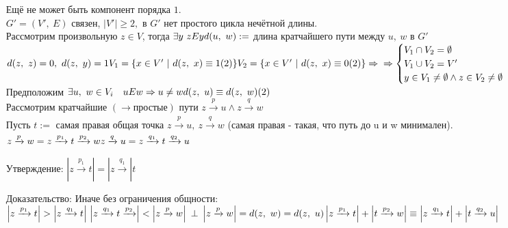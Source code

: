 \documentclass[12pt, letterpaper, twoside]{article}
\newcommand{\Abs}[1]{\left| #1 \right|}
\begin{document}
\begin{enumerate}
        Ещё не может быть компонент порядка $1$.\\
        $G' = (V',\ E)$ связен, $|V'| \geq 2,$ в $G'$ нет простого цикла нечётной длины.\\
        Рассмотрим произвольную $z\in V$, тогда $\exists y\ zEy\\
        d(u,\ w) := $ длина кратчайшего пути между $u,\ w$ в $G'$\\
        $d(z,\ z) = 0,\ d(z,\ y) = 1\\
        V_1 = \{x\in V'\ |\ d(z,\ x) \equiv 1 (2)\}\\
        V_2 = \{x \in V'\ |\ d(z,\ x) \equiv 0 (2)\}\Rightarrow\\
        \Rightarrow \begin{cases}
            V_1 \cap V_2 = \emptyset\\
            V_1 \cup V_2 = V'\\
            y\in V_1\neq \emptyset\wedge z \in V_2 \neq \emptyset
        \end{cases}$\\
        Предположим $\exists u,\ w\in V_i\quad uEw\Rightarrow u\neq w\\
        d(z,\ u) \equiv d(z,\ w) (2)$\\
        Рассмотрим кратчайшие $(\rightarrow\text{простые})$ пути $z\xrightarrow[]{p}u\wedge z\xrightarrow[]{q} w$\\
        Пусть $t :=$ самая правая общая точка $z\xrightarrow[]{p} u,\ z\xrightarrow[]{q} w$ (самая правая - такая, что путь до u и w минимален).\\
        $z\xrightarrow[]{p} w = z\xrightarrow[]{p_1} t \xrightarrow[]{p_2} w\\
        z\xrightarrow[]{q}u = z\xrightarrow[]{q_1} t \xrightarrow[]{q_2} u$\\
        \item[Утверждение:] $\Abs{z\xrightarrow[]{p_1} t} = \Abs{z\xrightarrow[]{q_1}} t$
        \item[Доказательство:] Иначе без ограничения общности:\\ 
        $\Abs{z\xrightarrow[]{p_1} t} > \Abs{z \xrightarrow[]{q_1}t}\\
        \Abs{z\xrightarrow[]{q_1} t \xrightarrow[]{p_2}} < \Abs{z\xrightarrow[]{p}w}\ \bot$
        $\Abs{z\xrightarrow[]{p} w} = d(z,\ w) = d(z,\ u)\\
        \Abs{z\xrightarrow[]{p_1} t} + \Abs{t\xrightarrow[]{p_2} w} \equiv \Abs{z\xrightarrow[]{q_1}t} + \Abs{t\xrightarrow[]{q_2} u}$\\

\end{enumerate}
\end{document}
